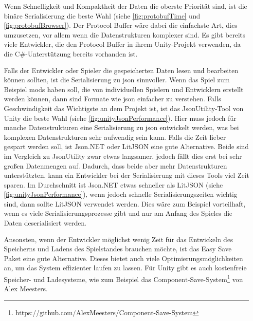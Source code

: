 Wenn Schnelligkeit und Kompaktheit der Daten die oberste Priorität sind, ist die binäre Serialisierung die beste Wahl (siehe \ref{fig:protobufTime} und \ref{fig:protobufBrowser}). Der Protocol Buffer wäre dabei die einfachste Art, dies umzusetzen, vor allem wenn die Datenstrukturen komplexer sind. Es gibt bereits viele Entwickler, die den Protocol Buffer in ihrem Unity-Projekt verwenden, da die C\#-Unterstützung bereits vorhanden ist. 

Falls der Entwickler oder Spieler die gespeicherten Daten lesen und bearbeiten können sollten, ist die Serialisierung zu \ac{json} sinnvoller. Wenn das Spiel zum Beispiel \acp{mod} haben soll, die von individuellen Spielern und Entwicklern erstellt werden können, dann sind Formate wie \ac{json} einfacher zu verstehen. Falls Geschwindigkeit das Wichtigste an dem Projekt ist, ist das JsonUtility-Tool von Unity die beste Wahl (siehe \ref{fig:unityJsonPerformance}). Hier muss jedoch für manche Datenstrukturen eine Serialisierung zu \ac{json} entwickelt werden, was bei komplexen Datenstrukturen sehr aufwendig sein kann. Falls die Zeit lieber gespart werden soll, ist Json.NET oder LitJSON eine gute Alternative. Beide sind im Vergleich zu JsonUtility zwar etwas langsamer, jedoch fällt dies erst bei sehr großen Datenmengen auf. Dadurch, dass beide aber mehr Datenstrukturen unterstützten, kann ein Entwickler bei der Serialisierung mit dieses Tools viel Zeit sparen. Im Durchschnitt ist Json.NET etwas schneller als LitJSON (siehe \ref{fig:unityJsonPerformance}), wenn jedoch schnelle Serialisierungszeiten wichtig sind, dann sollte LitJSON verwendet werden. Dies wäre zum Beispiel vorteilhaft, wenn es viele Serialisierungsprozesse gibt und nur am Anfang des Spieles die Daten deserialisiert werden.  

Ansonsten, wenn der Entwickler möglichst wenig Zeit für das Entwickeln des Speicherns und Ladens des Spielstandes brauchen möchte, ist das Easy Save Paket eine gute Alternative. Dieses bietet auch viele Optimierungsmöglichkeiten an, um das System effizienter laufen zu lassen. Für Unity gibt es auch kostenfreie Speicher- und Ladesysteme, wie zum Beispiel das Component-Save-System\footnote{https://github.com/AlexMeesters/Component-Save-System} von Alex Meesters. 



